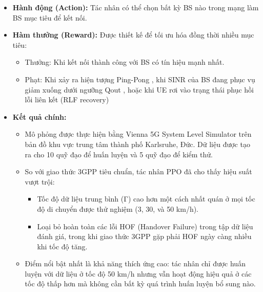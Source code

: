\documentclass{article} %
\begin{document}
\begin{itemize}
\begin{itemize}
\begin{enumerate}
            \item Một cờ nhị phân để thông báo cho tác nhân biết liệu một handover có khả năng gây ra hiện tượng ping-pong hay không (dựa trên thời gian tối thiểu giữa hai lần handover - MTS).
        \end{enumerate}
        \item \textbf{Hành động (Action):} Tác nhân có thể chọn bất kỳ BS nào trong mạng làm BS mục tiêu để kết nối.
    \item \textbf{Hàm thưởng (Reward):} Được thiết kế để tối ưu hóa đồng thời nhiều mục tiêu:
    \begin{itemize}
        \item Thưởng: Khi kết nối thành công với BS có tín hiệu mạnh nhất.
        \item Phạt: Khi xảy ra hiện tượng Ping-Pong , khi SINR của BS đang phục vụ giảm xuống dưới ngưỡng Qout , hoặc khi UE rơi vào trạng thái phục hồi lỗi liên kết (RLF recovery)
    \end{itemize}
    \item \textbf{Kết quả chính:}
    \begin{itemize}
        \item Mô phỏng được thực hiện bằng Vienna 5G System Level Simulator trên bản đồ khu vực trung tâm thành phố Karlsruhe, Đức. Dữ liệu được tạo ra cho 10 quỹ đạo để huấn luyện và 5 quỹ đạo để kiểm thử.
        \item So với giao thức 3GPP tiêu chuẩn, tác nhân PPO đã cho thấy hiệu suất vượt trội:
        \begin{itemize}
            \item Tốc độ dữ liệu trung bình (Γ) cao hơn một cách nhất quán ở mọi tốc độ di chuyển được thử nghiệm (3, 30, và 50 km/h).
            \item Loại bỏ hoàn toàn các lỗi HOF (Handover Failure) trong tập dữ liệu đánh giá, trong khi giao thức 3GPP gặp phải HOF ngày càng nhiều khi tốc độ tăng.
        \end{itemize}
        \item Điểm nổi bật nhất là khả năng thích ứng cao: tác nhân chỉ được huấn luyện với dữ liệu ở tốc độ 50 km/h nhưng vẫn hoạt động hiệu quả ở các tốc độ thấp hơn mà không cần bất kỳ quá trình huấn luyện bổ sung nào.
    \end{itemize}
    \end{itemize}
\end{itemize}
\end{document}
